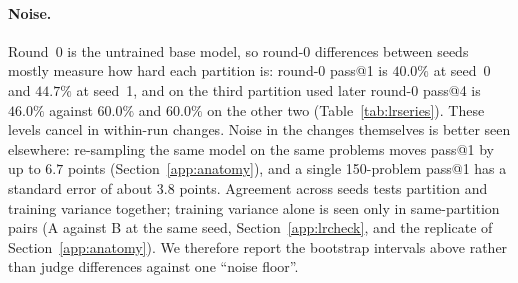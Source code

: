 \documentclass[runningheads]{llncs}
\begin{document}
\paragraph{Noise.}
Round~0 is the untrained base model, so round-0 differences between seeds
mostly measure how hard each partition is: round-0 pass@1 is $40.0\%$ at
seed~0 and $44.7\%$ at seed~1, and on the third partition used later round-0
pass@4 is $46.0\%$ against $60.0\%$ and $60.0\%$ on the other two
(Table~\ref{tab:lrseries}). These levels cancel in within-run changes. Noise in
the changes themselves is better seen elsewhere: re-sampling the same model on
the same problems moves pass@1 by up to $6.7$ points
(Section~\ref{app:anatomy}), and a single 150-problem pass@1 has a standard
error of about $3.8$ points. Agreement across seeds tests partition and
training variance together; training variance alone is seen only in
same-partition pairs (A against B at the same seed, Section~\ref{app:lrcheck},
and the replicate of Section~\ref{app:anatomy}). We therefore report the
bootstrap intervals above rather than judge differences against one ``noise
floor''.
\begin{table}[!htb]
\caption{All runs (Qwen2.5-1.5B-Instruct unless stated). Design~P was run once
per model. ``Pool'' is the round-0 kept pool (training examples; optimizer
steps are half of it).}
\label{tab:inventory}
\centering
\footnotesize
\setlength{\tabcolsep}{3pt}
\end{table}
\end{document}
